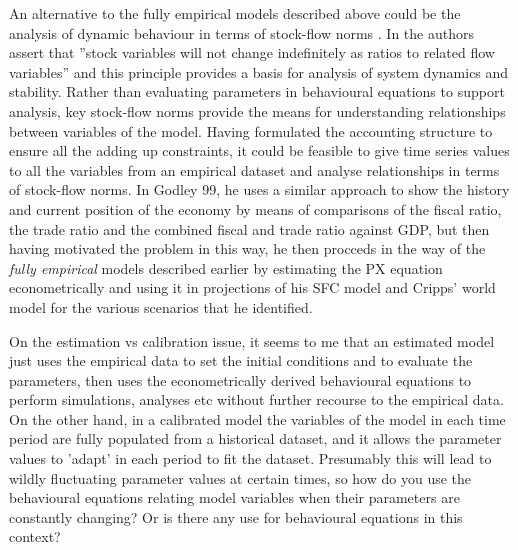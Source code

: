 \documentclass[twoside,a4paper,11pt]{article}
\begin{document}
An alternative to the fully empirical models described above could be the analysis of dynamic behaviour in terms of stock-flow norms \cite{Godley1999b}. In \cite[p42]{Godley1983} the authors assert that ''stock variables will not change indefinitely as ratios to related flow variables'' and this principle provides a basis for analysis of system dynamics and stability. Rather than evaluating parameters in behavioural equations to support analysis, key stock-flow norms provide the means for understanding relationships between variables of the model. Having formulated the accounting structure to ensure all the adding up constraints, it could be feasible to give time series values to all the variables from an empirical dataset and analyse relationships in terms of stock-flow norms. In Godley 99, he uses a similar approach to show the history and current position of the economy by means of comparisons of the fiscal ratio, the trade ratio and the combined fiscal and trade ratio against GDP, but then having motivated the problem in this way, he then procceds in the way of the \emph{fully empirical} models described earlier by estimating the PX equation econometrically and using it in projections of his SFC model and Cripps' world model for the various scenarios that he identified.

On the estimation vs calibration issue, it seems to me that an estimated model just uses the empirical data to set the initial conditions and to evaluate the parameters, then uses the econometrically derived behavioural equations to perform simulations, analyses etc without further recourse to the empirical data. On the other hand, in a calibrated model the variables of the model in each time period are fully populated from a historical dataset, and it allows the parameter values to 'adapt' in each period to fit the dataset. Presumably this will lead to wildly fluctuating parameter values at certain times, so how do you use the behavioural equations relating model variables when their parameters are constantly changing? Or is there any use for behavioural equations in this context?




\end{document}
